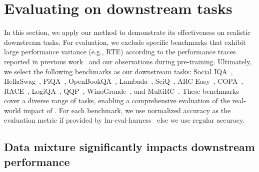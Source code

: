 \section{Evaluating on downstream tasks}
\label{sec:app}





In this section, we apply our method to demonstrate its effectiveness on realistic downstream tasks. For evaluation, we exclude specific benchmarks that exhibit large performance variance (e.g., RTE) according to the performance traces reported in previous work~\citep{openelm2024} and our observations during pre-training.
Ultimately, we select the following benchmarks as our downstream tasks: Social IQA~\citep{sap2019socialiqa}, HellaSwag~\citep{zellers2019hellaswag}, PiQA~\citep{bisk2020piqa}, OpenBookQA~\citep{mihaylov2018can}, Lambada~\citep{paperno2016lambada}, SciQ~\citep{welbl2017crowdsourcing}, ARC Easy~\citep{clark2018think}, COPA~\citep{sarlin2020superglue}, RACE~\citep{lai2017race}, LogiQA~\citep{liu2020logiqa}, QQP~\citep{wang2018glue}, WinoGrande~\citep{sakaguchi2021winogrande}, and MultiRC~\citep{khashabi2018looking}. These benchmarks cover a diverse range of tasks, enabling a comprehensive evaluation of the real-world impact of \ourmethod. For each benchmark, we use normalized accuracy as the evaluation metric if provided by lm-eval-harness~\citep{eval-harness} else we use regular accuracy.


\subsection{Data mixture significantly impacts downstream performance}

